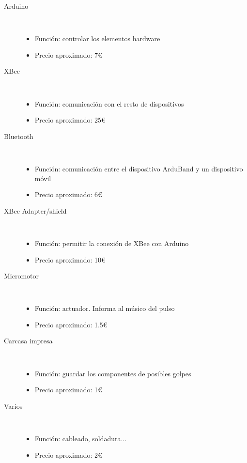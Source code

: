  \begin{description}
    \item [Arduino]\hfill \\
      \begin{itemize}
        \item {Función: controlar los elementos hardware}
        \item {Precio aproximado: 7\euro}
      \end{itemize}
    \item [XBee]\hfill \\
      \begin{itemize}
        \item {Función: comunicación con el resto de dispositivos}
        \item {Precio aproximado: 25\euro}
      \end{itemize}
      \item [Bluetooth]\hfill \\
        \begin{itemize}
          \item {Función: comunicación entre el dispositivo ArduBand y un dispositivo móvil}
          \item {Precio aproximado: 6\euro}
        \end{itemize}
      \item [XBee Adapter/shield]\hfill \\
        \begin{itemize}
          \item {Función: permitir la conexión de XBee con Arduino}
          \item {Precio aproximado: 10\euro}
        \end{itemize}
      \item [Micromotor]\hfill \\
        \begin{itemize}
          \item {Función: actuador. Informa al músico del pulso}
          \item {Precio aproximado: 1.5\euro}
        \end{itemize}
      \item [Carcasa impresa]\hfill \\
          \begin{itemize}
            \item {Función: guardar los componentes de posibles golpes}
            \item {Precio aproximado: 1\euro}
        \end{itemize}
      \item [Varios]\hfill \\
        \begin{itemize}
          \item {Función: cableado, soldadura...}
          \item {Precio aproximado: 2\euro}
        \end{itemize}
  \end{description}

